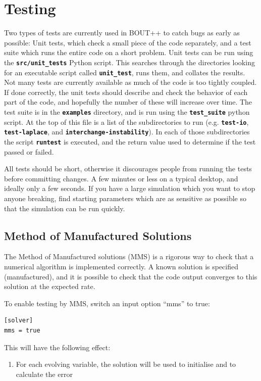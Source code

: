 \documentclass[12pt]{article}
\newcommand{\file}[1]{\texttt{\bf #1}}
\begin{document}
\section{Testing}
%
Two types of tests are currently used in BOUT++ to catch bugs as early as
possible: Unit tests, which check a small piece of the code separately, and a
test suite which runs the entire code on a short problem.
%
%
Unit tests can be run using the \file{src/unit\_tests} Python script. This
searches through the directories looking for an executable script called
\file{unit\_test}, runs them, and collates the results. Not many tests are
currently available as much of the code is too tightly coupled. If done
correctly, the unit tests should describe and check the behavior of each part
of the code, and hopefully the number of these will increase over time.
%
%
The test suite is in the \file{examples} directory, and is run using the
\file{test\_suite} python script. At the top of this file is a list of the
subdirectories to run (e.g. \file{test-io}, \file{test-laplace}, and
\file{interchange-instability}). In each of those subdirectories the script
\file{runtest} is executed, and the return value used to determine if the test
passed or failed.

All tests should be short, otherwise it discourages people from running the
tests before committing changes. A few minutes or less on a typical desktop,
and ideally only a few seconds. If you have a large simulation which you want
to stop anyone breaking, find starting parameters which are as sensitive as
possible so that the simulation can be run quickly.

\subsection{Method of Manufactured Solutions}
%
The Method of Manufactured solutions (MMS) is a rigorous way to check that a
numerical algorithm is implemented correctly. A known solution is specified
(manufactured), and it is possible to check that the code output converges to
this solution at the expected rate.

To enable testing by MMS, switch an input option ``mms'' to true:
%
\begin{lstlisting}
[solver]
mms = true
\end{lstlisting}
%
This will have the following effect:
%
\begin{enumerate}
\item For each evolving variable, the solution will be used to initialise and
    to calculate the error
\end{enumerate}
%
\end{document}
